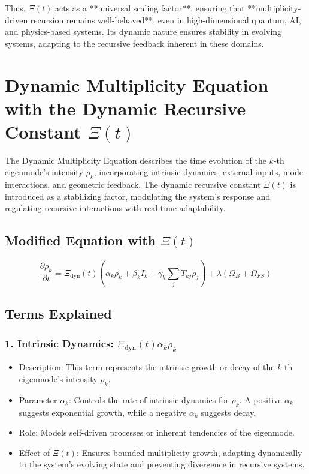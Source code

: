 \documentclass{article}
\theoremstyle{plain}
\begin{document}
\begin{itemize}
Thus, \(\Xi(t) \) acts as a **universal scaling factor**, ensuring that **multiplicity-driven recursion remains well-behaved**, even in high-dimensional quantum, AI, and physics-based systems. Its dynamic nature ensures stability in evolving systems, adapting to the recursive feedback inherent in these domains.

\section{Dynamic Multiplicity Equation with the Dynamic Recursive Constant \(\Xi(t) \)}

The Dynamic Multiplicity Equation describes the time evolution of the \( k \)-th eigenmode’s intensity \( \rho_k \), incorporating intrinsic dynamics, external inputs, mode interactions, and geometric feedback. The dynamic recursive constant \(\Xi(t) \) is introduced as a stabilizing factor, modulating the system's response and regulating recursive interactions with real-time adaptability.

\subsection{Modified Equation with \(\Xi(t) \)}

\begin{equation}
\frac{\partial \rho_k}{\partial t} = \Xi_{\text{dyn}}(t) \left( \alpha_k \rho_k + \beta_k I_k + \gamma_k \sum_j T_{kj} \rho_j \right) + \lambda (\Omega_B + \Omega_{FS})
\end{equation}

\subsection{Terms Explained}

\subsubsection{1. Intrinsic Dynamics: \( \Xi_{\text{dyn}}(t) \alpha_k \rho_k \)}
\begin{itemize}
    \item Description: This term represents the intrinsic growth or decay of the \( k \)-th eigenmode’s intensity \( \rho_k \).
    \item Parameter \( \alpha_k \): Controls the rate of intrinsic dynamics for \( \rho_k \). A positive \( \alpha_k \) suggests exponential growth, while a negative \( \alpha_k \) suggests decay.
    \item Role: Models self-driven processes or inherent tendencies of the eigenmode.
    \item Effect of \(\Xi(t) \): Ensures bounded multiplicity growth, adapting dynamically to the system's evolving state and preventing divergence in recursive systems.
\end{itemize}


\end{itemize}
\end{document}
